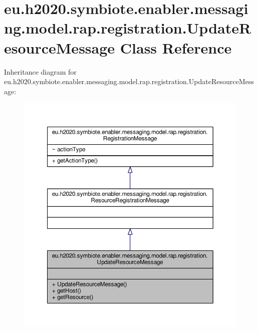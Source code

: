 \hypertarget{classeu_1_1h2020_1_1symbiote_1_1enabler_1_1messaging_1_1model_1_1rap_1_1registration_1_1UpdateResourceMessage}{}\section{eu.\+h2020.\+symbiote.\+enabler.\+messaging.\+model.\+rap.\+registration.\+Update\+Resource\+Message Class Reference}
\label{classeu_1_1h2020_1_1symbiote_1_1enabler_1_1messaging_1_1model_1_1rap_1_1registration_1_1UpdateResourceMessage}


Inheritance diagram for eu.\+h2020.\+symbiote.\+enabler.\+messaging.\+model.\+rap.\+registration.\+Update\+Resource\+Message\+:
\nopagebreak
\begin{figure}[H]
\begin{center}
\leavevmode
\includegraphics[width=350pt]{classeu_1_1h2020_1_1symbiote_1_1enabler_1_1messaging_1_1model_1_1rap_1_1registration_1_1UpdateResourceMessage__inherit__graph}
\end{center}
\end{figure}


